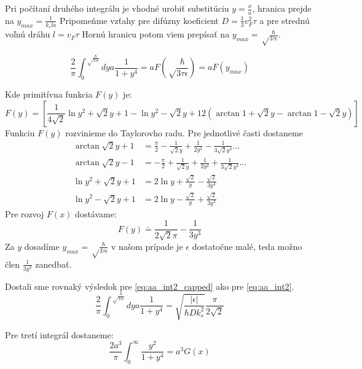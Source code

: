 Pri počítaní druhého integrálu je vhodné urobiť substitúciu $y=\frac{x}{a}$, hranica prejde na $y_{max}=\frac{1}{k_sla}$
Pripomeňme vzťahy pre difúzny koeficient $D=\frac{1}{3}v_F^2 \tau$ a pre strednú voľnú dráhu  $l=v_F \tau$
Hornú hranicu potom viem prepísať na $y_{max}=\sqrt\frac{\hbar}{3\tau \epsilon}$.

\begin{equation}
 \label{eq:aa_int2_capped}
 \frac{2}{\pi}\int_0^{\sqrt\frac{\hbar}{3\tau \epsilon}} dy a\frac{1}{1+y^4}=aF(\sqrt\frac{\hbar}{3\tau \epsilon})=aF(y_{max})
\end{equation}

Kde primitívna funkcia $F(y)$ je:
\begin{equation}
 \label{eq:aa_primitive_func}
 F(y)=[\frac{1}{4\sqrt 2} \ln{y^2+\sqrt 2 y+1}-\ln{y^2-\sqrt 2 y+1} 2(\arctan{1+\sqrt 2 y  } - \arctan{1-\sqrt 2 y})]
\end{equation}
Funkciu $F(y)$ rozvinieme do Taylorovho radu. Pre jednotlivé časti dostaneme
\begin{align*}
 \arctan{\sqrt 2 y+1}&=\frac{\pi}{2}-\frac{1}{\sqrt 2 y}+\frac{1}{2 y^2}-\frac{1}{3 \sqrt 2 y^3} ... \\
 \arctan{\sqrt 2 y -1}&= -\frac{\pi}{2}+\frac{1}{\sqrt 2 y}+\frac{1}{2 y^2}+\frac{1}{3 \sqrt 2 y^3} ...\\
 \ln{y^2+\sqrt 2 y+1}&=  2 \ln y + \frac{\sqrt 2} {y}-\frac{\sqrt 2}{3y^3}\\
 \ln{y^2-\sqrt 2 y+1}&= 2 \ln y - \frac{\sqrt 2} {y}+\frac{\sqrt 2}{3y^3}
\end{align*}
Pre rozvoj $F(x)$ dostávame:
\begin{equation}
 \label{eq:aa_primitive_func_taylor}
F(y)\doteq \frac{1}{2\sqrt2\pi} - \frac{1}{3y^3}
\end{equation}
Za $y$ dosadíme $y_{max}=\sqrt\frac{\hbar}{3\tau \epsilon}$ v našom prípade je $\epsilon$ dostatočne malé,
teda možno  člen $\frac{1}{3y^3}$ zanedbať.

Dostali sme rovnaký výsledok pre \eqref{eq:aa_int2_capped} ako pre \eqref{eq:aa_int2}.
\begin{equation}
 \label{eq:aa_int2_capped_final}
  \frac{2}{\pi}\int_0^{\sqrt\frac{\hbar}{3\tau \epsilon}} dy a\frac{1}{1+y^4}=\sqrt{\frac{|\epsilon|}{\hbar D k_s^2}} \frac{\pi}{2\sqrt{2}}
\end{equation}

 Pre tretí integrál dostaneme:
 \begin{equation}
  \label{eq:aa_int3_capped}
  \frac{2a^3}{\pi}\int_0^{\infty}\frac{y^2}{1+y^4}=a^3G(x)
 \end{equation}

